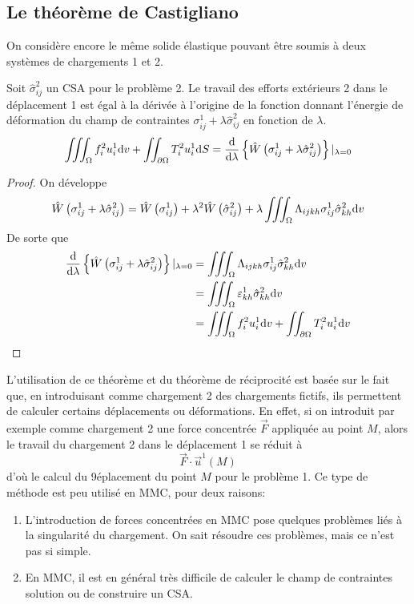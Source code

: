 \subsection{Le théorème de Castigliano} \label{ssec:Ch09-2.2}
On considère encore le même solide élastique pouvant être soumis à deux systèmes de chargements 1 et 2. 
\begin{thm}
    Soit $\hat{\sigma}_{ij}^2$ un CSA pour le problème 2.
    Le travail des efforts extérieurs 2 dans le déplacement 1 est égal à la dérivée à l'origine de la fonction donnant l'énergie de déformation du champ de contraintes $\sigma_{ij}^1 + \lambda \hat{\sigma}_{ij}^2$ en fonction de $\lambda$.
    \begin{equation}
        \iiint_{\Omega} f_i^2 u_i^1 \mathrm{d} v + \iint_{\partial \Omega} T_i^2 u_i^1 \mathrm{d} S = \frac{\mathrm{d}}{\mathrm{d} \lambda} \left\{ \hat{W}\left( \sigma_{ij}^1 + \lambda \hat{\sigma}_{ij}^2 \right) \right\} |_{\lambda=0}
        \label{eq:Ch09-062}
    \end{equation}
\end{thm}
\begin{proof}
    On développe 
    \[
    \hat{W}\left( \sigma_{ij}^1 + \lambda \hat{\sigma}_{ij}^2 \right) = \hat{W} \left( \sigma_{ij}^1 \right) + \lambda^2 \hat{W}\left( \hat{\sigma}_{ij}^2 \right) + \lambda \iiint_{\Omega} \Lambda_{ijkh} \sigma_{ij}^1 \hat{\sigma}_{kh}^2 \mathrm{d} v
    \]
    De sorte que 
    \begin{align*}
    \frac{\mathrm{d}}{\mathrm{d} \lambda} \left\{ \hat{W}\left( \sigma_{ij}^1 + \lambda \hat{\sigma}_{ij}^2 \right) \right\} |_{\lambda=0} &= \iiint_{\Omega} \Lambda_{ijkh} \sigma_{ij}^1 \hat{\sigma}_{kh}^2 \mathrm{d} v \\
        &= \iiint_{\Omega} \varepsilon_{kh}^1 \hat{\sigma}_{kh}^2 \mathrm{d} v \\
        &= \iiint_{\Omega} f_i^2 u_i^1 \mathrm{d} v + \iint_{\partial \Omega} T_i^2 u_i^1 \mathrm{d} v
    \end{align*}
\end{proof}

L'utilisation de ce théorème et du théorème de réciprocité est basée sur le fait que, en introduisant comme chargement 2 des chargements fictifs, ils permettent de calculer certains déplacements ou déformations.
En effet, si on introduit par exemple comme chargement 2 une force concentrée $\vec{F}$ appliquée au point $M$, alors le travail du  chargement 2 dans le déplacement 1 se réduit à
\begin{equation}
    \vec{F}\cdot \vec{u}^1 \left( M\right)
    \label{eq:Ch09-063}
\end{equation}
d'où le calcul du 9éplacement du point $M$ pour le problème 1.
Ce type de méthode est peu utilisé en MMC, pour deux raisons: 
\begin{enumerate}
    \item L'introduction de forces concentrées en MMC pose quelques problèmes liés à la singularité du chargement.
        On sait résoudre ces problèmes, mais ce n'est pas si simple. 
    \item En MMC, il est en général très difficile de calculer le champ de contraintes solution ou de construire un CSA. 
\end{enumerate}

